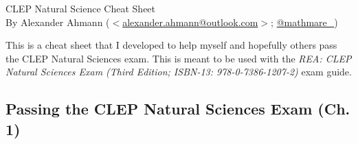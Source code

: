 \documentclass[10pt, landscape]{article}
\begin{document}
	\begin{center}
		\Huge{CLEP Natural Science Cheat Sheet} \\ 
		\Large{By Alexander Ahmann (\href{mailto:alexander.ahmann@outlook.com}{$<$alexander.ahmann@outlook.com$>$}; \href{https://twitter.com/mathmare\_}{@mathmare\_})}
	\end{center}
	
	This is a cheat sheet that I developed to help myself and hopefully others pass the CLEP Natural Sciences exam. This is meant to be used with the \textit{REA: CLEP Natural Sciences Exam (Third Edition; ISBN-13: 978-0-7386-1207-2)} exam guide.

	\begin{multicols}{2}
		\section{Passing the CLEP Natural Sciences Exam (Ch. 1)}

\end{multicols}
\end{document}
